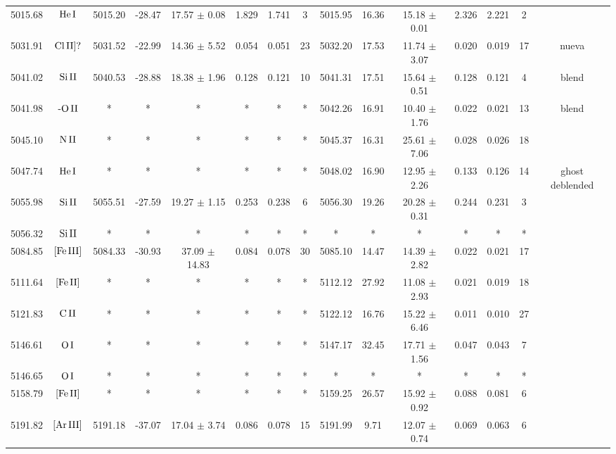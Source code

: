 \documentclass{article}
\begin{document}
\begin{table*}
\begin{adjustbox}{width=\textwidth}
\begin{tabular}{ccccccccccccccc}
5015.68 & $\mbox{He}\thinspace \mbox{I}$ & 5015.20 & -28.47 & 17.57 $\pm$ 0.08 & 1.829 & 1.741 & 3 & 5015.95 & 16.36 & 15.18 $\pm$ 0.01 & 2.326 & 2.221 & 2 &  \\
5031.91 & $\mbox{Cl}\thinspace \mbox{II]?}$ & 5031.52 & -22.99 & 14.36 $\pm$ 5.52 & 0.054 & 0.051 & 23 & 5032.20 & 17.53 & 11.74 $\pm$ 3.07 & 0.020 & 0.019 & 17 &  nueva \\
5041.02 & $\mbox{Si}\thinspace \mbox{II}$ & 5040.53 & -28.88 & 18.38 $\pm$ 1.96 & 0.128 & 0.121 & 10 & 5041.31 & 17.51 & 15.64 $\pm$ 0.51 & 0.128 & 0.121 & 4 &  blend \\
5041.98 & $\mbox{-O}\thinspace \mbox{II}$ & * & * & * & * & * & * & 5042.26 & 16.91 & 10.40 $\pm$ 1.76 & 0.022 & 0.021 & 13 &  blend \\
5045.10 & $\mbox{N}\thinspace \mbox{II}$ & * & * & * & * & * & * & 5045.37 & 16.31 & 25.61 $\pm$ 7.06 & 0.028 & 0.026 & 18 &  \\
5047.74 & $\mbox{He}\thinspace \mbox{I}$ & * & * & * & * & * & * & 5048.02 & 16.90 & 12.95 $\pm$ 2.26 & 0.133 & 0.126 & 14 &  ghost deblended \\
5055.98 & $\mbox{Si}\thinspace \mbox{II}$ & 5055.51 & -27.59 & 19.27 $\pm$ 1.15 & 0.253 & 0.238 & 6 & 5056.30 & 19.26 & 20.28 $\pm$ 0.31 & 0.244 & 0.231 & 3 &  \\
5056.32 & $\mbox{Si}\thinspace \mbox{II}$ & * & * & * & * & * & * & * & * & * & * & * & * &  \\
5084.85 & $\mbox{[Fe}\thinspace \mbox{III]}$ & 5084.33 & -30.93 & 37.09 $\pm$ 14.83 & 0.084 & 0.078 & 30 & 5085.10 & 14.47 & 14.39 $\pm$ 2.82 & 0.022 & 0.021 & 17 &  \\
5111.64 & $\mbox{[Fe}\thinspace \mbox{II]}$ & * & * & * & * & * & * & 5112.12 & 27.92 & 11.08 $\pm$ 2.93 & 0.021 & 0.019 & 18 &  \\
5121.83 & $\mbox{C}\thinspace \mbox{II}$ & * & * & * & * & * & * & 5122.12 & 16.76 & 15.22 $\pm$ 6.46 & 0.011 & 0.010 & 27 &  \\
5146.61 & $\mbox{O}\thinspace \mbox{I}$ & * & * & * & * & * & * & 5147.17 & 32.45 & 17.71 $\pm$ 1.56 & 0.047 & 0.043 & 7 &  \\
5146.65 & $\mbox{O}\thinspace \mbox{I}$ & * & * & * & * & * & * & * & * & * & * & * & * &  \\
5158.79 & $\mbox{[Fe}\thinspace \mbox{II]}$ & * & * & * & * & * & * & 5159.25 & 26.57 & 15.92 $\pm$ 0.92 & 0.088 & 0.081 & 6 &  \\
5191.82 & $\mbox{[Ar}\thinspace \mbox{III]}$ & 5191.18 & -37.07 & 17.04 $\pm$ 3.74 & 0.086 & 0.078 & 15 & 5191.99 & 9.71 & 12.07 $\pm$ 0.74 & 0.069 & 0.063 & 6 &  \\

\end{tabular}
\end{adjustbox}
\end{table*}
\end{document}

